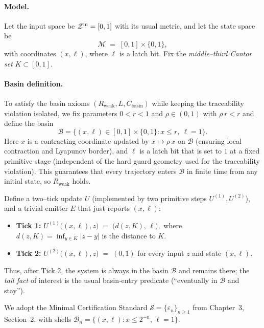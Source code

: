 \documentclass[12pt]{article}
\theoremstyle{definition}
\theoremstyle{plain}
\begin{document}
\paragraph{Model.}
Let the input space be \(\mathcal Z^{\rm in}=[0,1]\) with its usual metric, and let the state space be
\[
\mathcal M \;=\; [0,1]\times\{0,1\},
\]
with coordinates \((x,\ell)\), where \(\ell\) is a latch bit. Fix the \emph{middle–third Cantor set} \(K\subset[0,1]\).
\paragraph{Basin definition.}
To satisfy the basin axioms $(R_{\mathrm{weak}},L,C_{\mathrm{basin}})$ while keeping the traceability violation isolated, we fix parameters $0<r<1$ and $\rho\in(0,1)$ with $\rho\,r<r$ and define the basin
\[
  \mathcal B = \{(x,\ell)\in[0,1]\times\{0,1\} : x\le r,\ \ell=1\}.
\]
Here $x$ is a contracting coordinate updated by $x\mapsto \rho\,x$ on $\mathcal B$ (ensuring local contraction and Lyapunov border), and $\ell$ is a latch bit that is set to $1$ at a fixed primitive stage (independent of the hard guard geometry used for the traceability violation). This guarantees that every trajectory enters $\mathcal B$ in finite time from any initial state, so $R_{\mathrm{weak}}$ holds.

Define a two–tick update \(U\) (implemented by two primitive steps \(U^{(1)},U^{(2)}\)), and a trivial emitter \(E\) that just reports \((x,\ell)\):

\begin{itemize}[leftmargin=2em]
  \item \textbf{Tick 1:} 
  \(
    U^{(1)}\bigl((x,\ell),z\bigr) \;=\; \bigl(d(z,K),\,\ell\bigr),
  \)
  where \(d(z,K)=\inf_{y\in K}|z-y|\) is the distance to \(K\).
  \item \textbf{Tick 2:}
  \(
    U^{(2)}\bigl((x,\ell),z\bigr) \;=\; (0,1)
  \)
  for every input \(z\) and state \((x,\ell)\).
\end{itemize}

Thus, after Tick 2, the system is always in the basin \(\mathcal B\) and remains there; the \emph{tail fact} of interest is the usual basin‐entry predicate (“eventually in \(\mathcal B\) and stay”).

We adopt the Minimal Certification Standard \(\mathcal S=\{\varepsilon_n\}_{n\ge1}\) from Chapter~3, Section~2, with shells \(\mathcal B_n=\{(x,\ell):x\le 2^{-n},\,\ell=1\}\).
\end{document}

